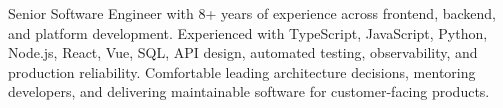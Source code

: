

\begin{cvparagraph}
    Senior Software Engineer with 8+ years of experience across frontend, backend, and platform development. Experienced with TypeScript, JavaScript, Python, Node.js, React, Vue, SQL, API design, automated testing, observability, and production reliability. Comfortable leading architecture decisions, mentoring developers, and delivering maintainable software for customer-facing products.
\end{cvparagraph}
